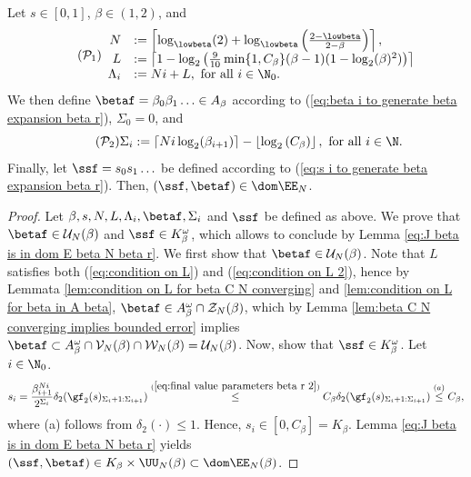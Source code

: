 \begin{theorem}\label{thm:final conditions P1 P2}
	Let $s \in [0,1]$, $\beta \in (1,2)$, and
	\begin{equation}\label{eq:final value parameters beta r 1}\tag{\text{$\mathcal{P}_1$}}
		\begin{array}{rl}
			N &:= \left\lceil\log_{\lowbeta}(2) + \log_{\lowbeta}\left( \frac{2- {\lowbeta}}{2 - \beta} \right)\right\rceil,\\
			L &:= \left\lceil 1-\log_2\left(\frac{9}{10}\min\{1,C_\beta\}(\beta-1) (1-\log_2(\beta)^2)\right)\right\rceil\\
			\Lambda_i &:= Ni + L, \ \text{for all} \ i \in \N_0. 
		\end{array}
	\end{equation}
	We then define $\betaf = \beta_0\beta_1\ldots \in A_\beta$ according to (\ref{eq:beta i to generate beta expansion beta r}), $\Sigma_0 =0$, and
	\begin{equation}\label{eq:final value parameters beta r 2}\tag{\text{$\mathcal{P}_2$}}
		\Sigma_i := \lceil Ni\log_2(\beta_{i+1})\rceil - \left\lfloor \log_2\left(C_\beta\right) \right\rfloor, \ \text{for all} \ i \in \N.
	\end{equation}
	Finally, let $\ssf = s_0s_1\ldots$ be defined according to (\ref{eq:s i to generate beta expansion beta r}). Then, $(\ssf,\betaf) \in \dom \EE_N$.
\end{theorem}
\begin{proof}
	Let $\beta,s,N,L,\Lambda_i,\betaf, \Sigma_i$ and $\ssf$ be defined as above. We prove that $\betaf \in \mathcal U_N(\beta)$ and $\ssf \in K_\beta^\omega$, which allows to conclude by Lemma \ref{eq:J beta is in dom E beta N beta r}. We first show that $\betaf \in \mathcal U_N(\beta)$. Note that $L$ satisfies both (\ref{eq:condition on L}) and (\ref{eq:condition on L 2}), hence by Lemmata \ref{lem:condition on L for beta C N converging} and \ref{lem:condition on L for beta in A beta}, $\betaf \in A^\omega_\beta \cap \mathcal Z_N(\beta)$, which by Lemma \ref{lem:beta C N converging implies bounded error} implies $\betaf \subset A^\omega_\beta \cap \mathcal V_N(\beta)\cap \mathcal W_N(\beta)= \mathcal U_N(\beta)$. Now, show that $\ssf \in K_\beta^\omega$. Let $i \in \N_0$.
	\begin{align}
		s_i = \frac{\beta_{i+1}^{Ni}}{2^{\Sigma_i}} \delta_2(\gf_2(s)_{\Sigma_i+1:\Sigma_{i+1}}) \overset{(\ref{eq:final value parameters beta r 2})}{\leq} C_\beta \delta_2(\gf_2(s)_{\Sigma_i+1:\Sigma_{i+1}}) \overset{(a)}{\leq} C_\beta,
	\end{align}
	where (a) follows from $\delta_2(\cdot) \leq 1$. Hence, $s_i \in [0,C_\beta] = K_\beta$. Lemma \ref{eq:J beta is in dom E beta N beta r} yields $(\ssf, \betaf) \in K_\beta \times \UU_N(\beta) \subset \dom \EE_N(\beta)$.
\end{proof}

